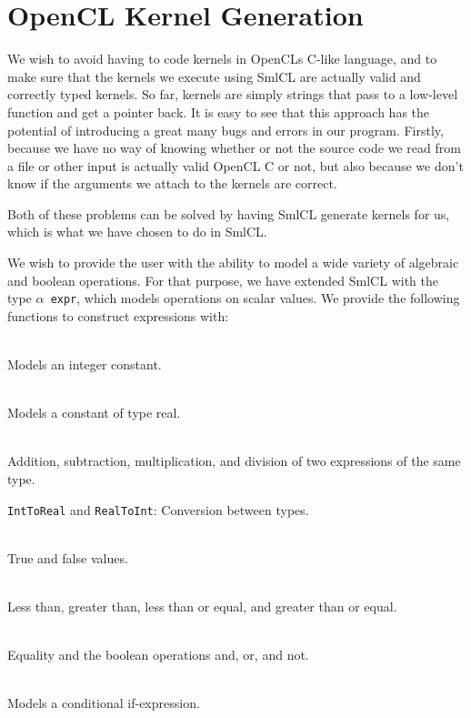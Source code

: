 \section{OpenCL Kernel Generation}
\label{kerngen}

We wish to avoid having to code kernels in OpenCLs C-like language,
and to make sure that the kernels we execute using SmlCL are actually
valid and correctly typed kernels. So far, kernels are simply strings
that pass to a low-level function and get a pointer back. It is easy
to see that this approach has the potential of introducing a great
many bugs and errors in our program. Firstly, because we have no way
of knowing whether or not the source code we read from a file or other
input is actually valid OpenCL C or not, but also because we don't
know if the arguments we attach to the kernels are correct.

Both of these problems can be solved by having SmlCL generate kernels
for us, which is what we have chosen to do in SmlCL.

We wish to provide the user with the ability to model a wide variety
of algebraic and boolean operations. For that purpose, we have
extended SmlCL with the type \texttt{$\alpha$ expr}, which models
operations on scalar values. We provide the following functions to
construct expressions with:

\begin{description}
  \item[\texttt{IntC}] \hfill \\ Models an integer constant.
  \item[\texttt{RealC}] \hfill \\ Models a constant of type real.
  \item[\texttt{Add}, \texttt{Sub}, \texttt{Mul}, and \texttt{Div}]
    \hfill \\
    Addition, subtraction, multiplication, and division of two
    expressions of the same type.
  \item \texttt{IntToReal} and \texttt{RealToInt}: Conversion between
    types.
  \item[\texttt{True} and \texttt{False}] \hfill \\ True and false values.
  \item[\texttt{Lt}, \texttt{Gt}, \texttt{Leq}, \texttt{Geq}] \hfill
    \\ Less than, greater than, less than or equal, and greater than
    or equal.
  \item[\texttt{Eq}, \texttt{And}, \texttt{Or}, and \texttt{Not}]
    \hfill \\
    Equality and the boolean operations and, or, and not.
  \item[\texttt{If}] \hfill \\ Models a conditional if-expression.
\end{description}

